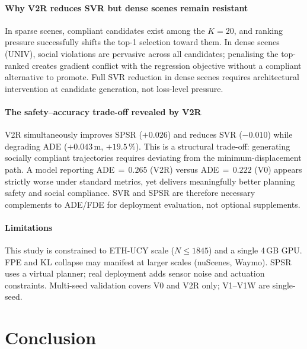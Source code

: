 \documentclass[journal]{IEEEtran}
\begin{document}
\paragraph{Why V2R reduces SVR but dense scenes remain resistant}
In sparse scenes, compliant candidates exist among the $K{=}20$,
and ranking pressure successfully shifts the top-1 selection toward
them.
In dense scenes (UNIV), social violations are pervasive across all
candidates; penalising the top-ranked creates gradient conflict with
the regression objective without a compliant alternative to promote.
Full SVR reduction in dense scenes requires architectural intervention
at candidate generation, not loss-level pressure.

\paragraph{The safety--accuracy trade-off revealed by V2R}
V2R simultaneously improves SPSR ($+0.026$) and reduces SVR ($-0.010$)
while degrading ADE ($+0.043$\,m, $+19.5\,\%$).
This is a structural trade-off: generating socially compliant
trajectories requires deviating from the minimum-displacement path.
A model reporting ADE\,\(=\,0.265\) (V2R) versus ADE\,\(=\,0.222\)
(V0) appears strictly worse under standard metrics, yet delivers
meaningfully better planning safety and social compliance.
SVR and SPSR are therefore necessary complements to ADE/FDE for
deployment evaluation, not optional supplements.

\paragraph{Limitations}
This study is constrained to ETH-UCY scale ($N\leq1845$) and a
single 4\,GB GPU.
FPE and KL collapse may manifest at larger scales (nuScenes, Waymo).
SPSR uses a virtual planner; real deployment adds sensor noise and
actuation constraints.
Multi-seed validation covers V0 and V2R only; V1--V1W are single-seed.

\section{Conclusion}
\label{sec:conclusion}
\end{document}
